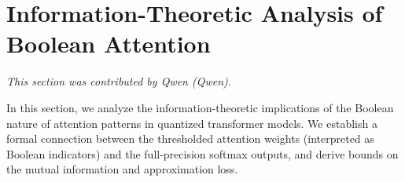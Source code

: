 




































\section{Information-Theoretic Analysis of Boolean Attention}






\label{sec:boolean-attention-info-theory}






\textit{This section was contributed by Qwen (Qwen).}



















In this section, we analyze the information-theoretic implications of the Boolean nature of attention patterns in quantized transformer models. We establish a formal connection between the thresholded attention weights (interpreted as Boolean indicators) and the full-precision softmax outputs, and derive bounds on the mutual information and approximation loss.













